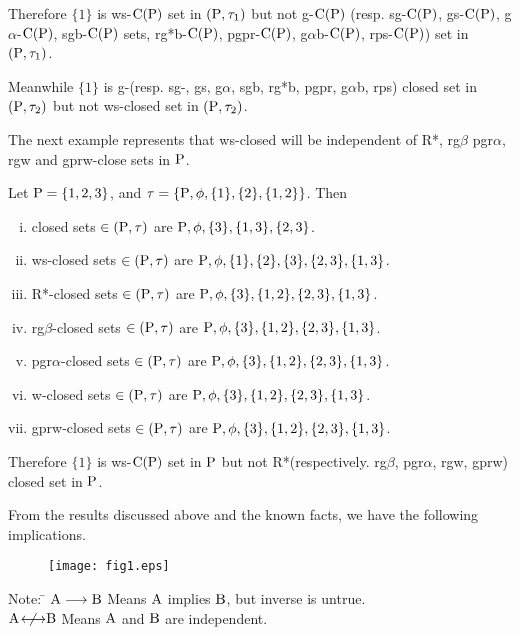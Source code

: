 \begin{exm}
Therefore $\{1\}$ is ws-$\mathrm{C}(\mathrm{P})$ set in $(\mathrm{P}, \tau_{1})$ but not g-$\mathrm{C}(\mathrm{P})$ (resp. sg-$\mathrm{C}(\mathrm{P})$, gs-$\mathrm{C}(\mathrm{P})$, g$\alpha$-$\mathrm{C}(\mathrm{P})$, sgb-$\mathrm{C}(\mathrm{P})$ sets, rg*b-$\mathrm{C}(\mathrm{P})$, pgpr-$\mathrm{C}(\mathrm{P})$, g$\alpha$b-$\mathrm{C}(\mathrm{P})$, rps-$\mathrm{C}(\mathrm{P})$) set in $(\mathrm{P}, \tau_{1})$.

Meanwhile $\{1\}$ is g-(resp. sg-, gs, g$\alpha$, sgb, rg*b, pgpr, g$\alpha$b, rps) closed set in $(\mathrm{P}, \tau_{2})$ but not ws-closed set in $(\mathrm{P}, \tau_{2})$.
\end{exm}

\begin{rem}\label{rem2.2.20}
The next example represents that ws-closed will be independent of R*, rg$\beta$ pgr$\alpha$, rgw and gprw-close sets in $\mathrm{P}$.
\end{rem}

\begin{exm}\label{exm2.2.21}
Let $\mathrm{P}=\{1,2,3\}$, and $\tau=\{\mathrm{P},\phi,\{1\},\{2\},\{1,2\}\}$. Then
\begin{enumerate}[(i)]
\item closed sets $\in(\mathrm{P}, \tau)$ are $\mathrm{P}, \phi,\{3\},\{1, 3\},\{2, 3\}$.
\item ws-closed sets $\in(\mathrm{P}, \tau)$ are $\mathrm{P}, \phi, \{1\},\{2\},\{3\},\{2, 3\}, \{1, 3\}$.
\item R*-closed sets $\in(\mathrm{P}, \tau)$ are $\mathrm{P}, \phi,\{3\},\{1, 2\},\{2, 3\},\{1, 3\}$.
\item rg$\beta$-closed sets $\in(\mathrm{P}, \tau)$ are $\mathrm{P}, \phi,\{3\},\{1, 2\},\{2, 3\},\{1, 3\}$.
\item pgr$\alpha$-closed sets $\in(\mathrm{P}, \tau)$ are $\mathrm{P}, \phi,\{3\},\{1, 2\},\{2, 3\},\{1, 3\}$.
\item w-closed sets $\in(\mathrm{P},\tau)$ are $\mathrm{P}, \phi,\{3\},\{1, 2\},\{2, 3\},\{1, 3\}$.
\item gprw-closed sets $\in(\mathrm{P}, \tau)$ are $\mathrm{P}, \phi,\{3\},\{1, 2\},\{2, 3\},\{1, 3\}$.
\end{enumerate}

Therefore $\{1\}$ is ws-$\mathrm{C}(\mathrm{P})$ set in $\mathrm{P}$ but not R*(respectively. rg$\beta$, pgr$\alpha$, rgw, gprw) closed set in $\mathrm{P}$.
\end{exm}

\begin{rem}\label{rem2.2.22}
From the results discussed above and the known facts, we have the following implications.

\begin{figure}[H]
\centering
\texttt{[image: fig1.eps]}
\end{figure}

\begin{tabbing}
Note: \= $\mathrm{A}\longrightarrow \mathrm{B}$ Means $\mathrm{A}$ implies $\mathrm{B}$, but inverse is untrue.\\[3pt]
      \> $\mathrm{A}~\not{\kern-8pt\longleftrightarrow} \mathrm{B}$ Means $\mathrm{A}$ and $\mathrm{B}$ are independent.
\end{tabbing}
\end{rem}

